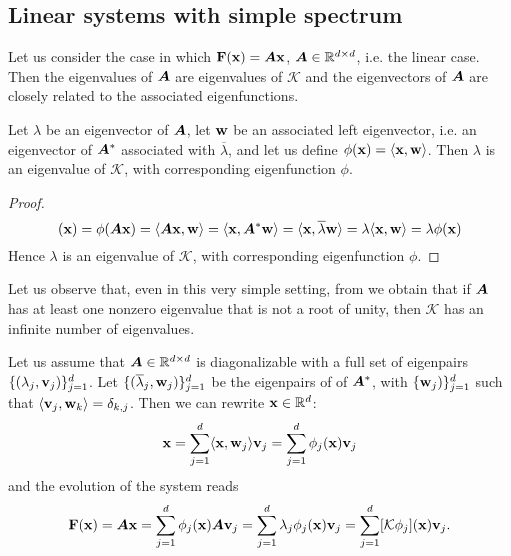 \subsection{Linear systems with simple spectrum}
Let us consider the case in which $\vb{F}(\vb{x}) = \vb*{A}\vb{x}$, $\vb*{A}\in\mathbb{R}^{d\times d}$, i.e. the linear case. Then the eigenvalues of $\vb*{A}$ are eigenvalues of $\mathcal{K}$ and the eigenvectors of $\vb*{A}$ are closely related to the associated eigenfunctions.

\begin{prop}
Let $\lambda$ be an eigenvector of $\vb*{A}$, let $\vb{w}$ be an associated left eigenvector, i.e. an eigenvector of $\vb*{A}^*$ associated with $\overline{\lambda}$, and let us define $\phi(\vb{x}) = \langle \vb{x},\vb{w} \rangle$. Then $\lambda$ is an eigenvalue of $\mathcal{K}$, with corresponding eigenfunction $\phi$.
\end{prop}
\begin{proof}
\begin{equation*}
    [\mathcal{K}\phi](\vb{x}) = \phi(\vb*{A}\vb{x}) = \langle \vb*{A}\vb{x},\vb{w} \rangle = \langle \vb{x}, \vb*{A}^*\vb{w} \rangle = \langle \vb{x}, \overline{\lambda}\vb{w} \rangle = \lambda \langle \vb{x},\vb{w} \rangle = \lambda \phi(\vb{x})
\end{equation*}
Hence $\lambda$ is an eigenvalue of $\mathcal{K}$, with corresponding eigenfunction $\phi$.
\end{proof}

Let us observe that, even in this very simple setting, from  we obtain that if $\vb*{A}$ has at least one nonzero eigenvalue that is not a root of unity, then $\mathcal{K}$ has an infinite number of eigenvalues.

\begin{corollary}
Let us assume that $\vb*{A}\in\mathbb{R}^{d\times d}$ is diagonalizable with a full set of eigenpairs $\{(\lambda_j, \vb{v}_j)\}_{j=1}^{d}$. Let $\{(\overline{\lambda}_j, \vb{w}_j)\}_{j=1}^{d}$ be the eigenpairs of of $\vb*{A}^*$, with $\{\vb{w}_j)\}_{j=1}^{d}$ such that $\langle \vb{v}_j, \vb{w}_k\rangle = \delta_{k,j}$. Then we can rewrite $\vb{x}\in\mathbb{R}^d$:
\begin{equation}
    \label{decomposition_linear}
    \vb{x} = \sum_{j=1}^d \langle \vb{x}, \vb{w}_j\rangle \vb{v}_j = \sum_{j=1}^d \phi_j(\vb{x}) \vb{v}_j
\end{equation}
and the evolution of the system reads
\begin{equation}
    \label{evolution_linear}
    \vb{F}(\vb{x}) = \vb*{A}\vb{x}  = \sum_{j=1}^d \phi_j(\vb{x}) \vb*{A}\vb{v}_j = \sum_{j=1}^d \lambda_j \phi_j(\vb{x}) \vb{v}_j = \sum_{j=1}^d [\mathcal{K}\phi_j](\vb{x})\vb{v}_j.
\end{equation}
\end{corollary}

